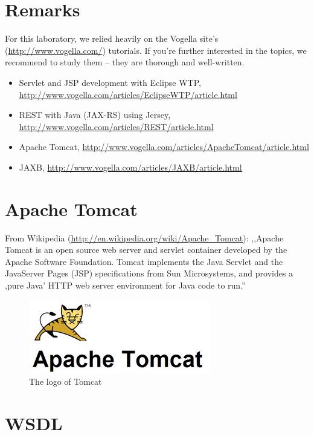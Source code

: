 \documentclass[]{report}
\let\Oldincludegraphics\includegraphics
\renewcommand{\includegraphics}[1]{
\begin{adjustbox}{max size={\textwidth}{\textheight}}
    \Oldincludegraphics[scale=0.6]{#1}%
\end{adjustbox}
}
\begin{document}
\section{Remarks}

For this laboratory, we relied heavily on the Vogella site's
(\url{http://www.vogella.com/}) tutorials. If you're further interested
in the topics, we recommend to study them -- they are thorough and
well-written.

\begin{itemize}
\itemsep1pt\parskip0pt
\item
  Servlet and JSP development with Eclipse WTP,
  \url{http://www.vogella.com/articles/EclipseWTP/article.html}
\item
  REST with Java (JAX-RS) using Jersey,
  \url{http://www.vogella.com/articles/REST/article.html}
\item
  Apache Tomcat,
  \url{http://www.vogella.com/articles/ApacheTomcat/article.html}
\item
  JAXB, \url{http://www.vogella.com/articles/JAXB/article.html}
\end{itemize}

\section{Apache Tomcat}

From Wikipedia (\url{http://en.wikipedia.org/wiki/Apache_Tomcat}):
,,Apache Tomcat is an open source web server and servlet container
developed by the Apache Software Foundation. Tomcat implements the Java
Servlet and the JavaServer Pages (JSP) specifications from Sun
Microsystems, and provides a ,pure Java' HTTP web server environment for
Java code to run.''

\begin{figure}[htbp]
\centering
\includegraphics{img/web_services/logo.jpg}
\caption{The logo of Tomcat}
\end{figure}

\section{WSDL}
\end{document}
